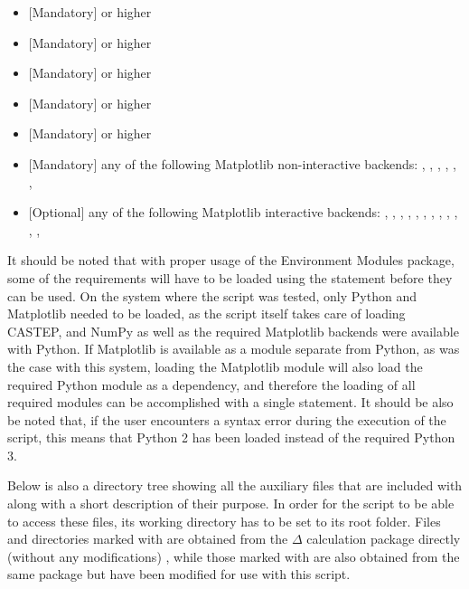 \begin{itemize}
    \item $[$Mandatory$]$  or higher \cite{modules}
    \item $[$Mandatory$]$  or higher \cite{castep}
    \item $[$Mandatory$]$  or higher \cite{python}
    \item $[$Mandatory$]$  or higher \cite{numpy}
    \item $[$Mandatory$]$  or higher \cite{matplotlib}
    \item $[$Mandatory$]$ any of the following Matplotlib non-interactive backends: , , , , , , 
    \item $[$Optional$]$ any of the following Matplotlib interactive backends: , , , , , , , , , , , , 
\end{itemize}

It should be noted that with proper usage of the Environment Modules package, some of the requirements will have to be loaded using the  statement before they can be used. On the system where the script was tested, only Python and Matplotlib needed to be loaded, as the script itself takes care of loading CASTEP, and NumPy as well as the required Matplotlib backends were available with Python. If Matplotlib is available as a module separate from Python, as was the case with this system, loading the Matplotlib module will also load the required Python module as a dependency, and therefore the loading of all required modules can be accomplished with a single statement. It should be also be noted that, if the user encounters a syntax error during the execution of the script, this means that Python 2 has been loaded instead of the required Python 3.

Below is also a directory tree showing all the auxiliary files that are included with  along with a short description of their purpose. In order for the script to be able to access these files, its working directory has to be set to its root folder. Files and directories marked with \code{*} are obtained from the $\Delta$ calculation package directly (without any modifications) \cite{delta}, while those marked with \code{**} are also obtained from the same package but have been modified for use with this script.

